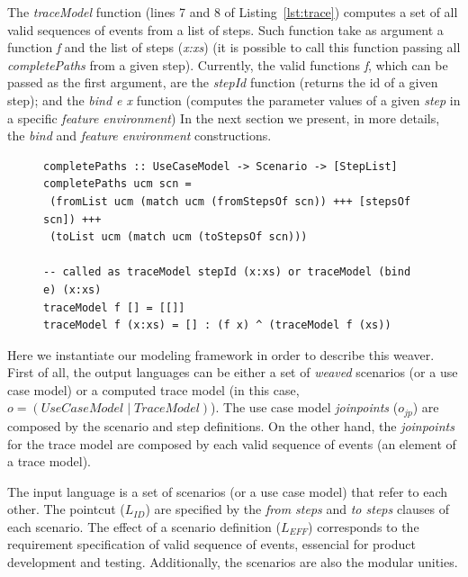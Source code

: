 \documentclass{llncs}
\begin{document}

The \emph{traceModel} function (lines 7 and 8 of
Listing~\ref{lst:trace}) computes a set of all valid sequences of 
events from a list of steps. Such function take as argument a function
\emph{f} and the list of steps (\emph{x:xs}) (it is possible to call
this function passing  all \emph{completePaths} from a given step).
Currently, the valid functions \emph{f}, which can be passed as the
first argument, are the \emph{stepId} function (returns the id
of a given step); and the \emph{bind e x} function (computes the
parameter values of a given \emph{step} in a specific \emph{feature
environment}) In the next section we present, in more details, the \emph{bind} and \emph{feature
environment} constructions.

\begin{figure}
\begin{lstlisting}[belowskip=10pt,frame=tb,caption={The \emph{completePaths} and \emph{traceModel weaver} 
functions},label=lst:trace]
completePaths :: UseCaseModel -> Scenario -> [StepList]
completePaths ucm scn =
 (fromList ucm (match ucm (fromStepsOf scn)) +++ [stepsOf scn]) +++ 
 (toList ucm (match ucm (toStepsOf scn)))

-- called as traceModel stepId (x:xs) or traceModel (bind e) (x:xs)
traceModel f [] = [[]]
traceModel f (x:xs) = [] : (f x) ^ (traceModel f (xs))
\end{lstlisting}
\end{figure}

Here we instantiate our modeling framework in order to describe 
this weaver. First of all, the output languages can be either a set of \emph{weaved} scenarios (or
a use case model) or a computed trace model (in this case, $o =
(UseCaseModel \mid TraceModel)$). The use case model \emph{joinpoints} ($o_{jp}$)
are composed by the scenario and step definitions. On the other hand, the
\emph{joinpoints} for the trace model are composed by each valid
sequence of events (an element of a trace model).

The input language is a set of scenarios (or a use case model) that refer to
each other. The pointcut ($L_{ID}$) are specified by
the \emph{from steps} and \emph{to steps} clauses of each scenario. The effect 
of a scenario definition ($L_{EFF}$) corresponds
to the requirement specification of valid sequence of events, essencial
for product development and testing.  Additionally, the scenarios
are also the modular unities.
\end{document}
